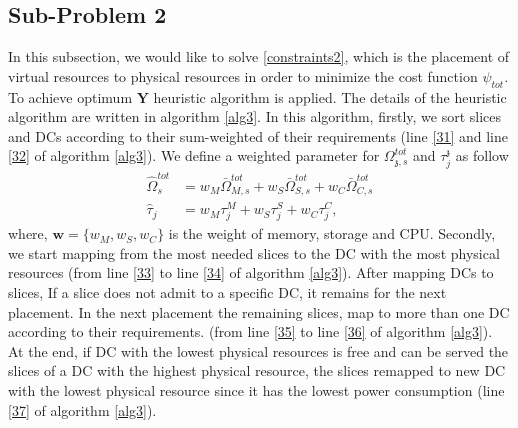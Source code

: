 \documentclass[conference]{IEEEtran}
\begin{document}
\subsection{Sub-Problem 2}
In this subsection, we would like to solve  \eqref{constraints2}, which is the placement of virtual resources to physical resources in order to minimize the cost function $\psi_{tot}$.
To achieve optimum $\boldsymbol{Y}$ heuristic algorithm is applied. The details of the heuristic algorithm are written in algorithm \eqref{alg3}. In this algorithm, firstly, we sort slices and DCs according to their sum-weighted of their requirements (line \ref{31} and line \ref{32} of algorithm \ref{alg3}).
We define a weighted parameter for $\Omega_{\mathfrak{z},s}^{tot}$ and $\tau_j^\mathfrak{z}$ as follow
\begin{equation}\label{wt}
\begin{split}
\hat{\Omega}_{s}^{tot} &= w_M \bar{\Omega}_{M,s}^{tot} + w_S \bar{\Omega}_{S,s}^{tot} + w_C \bar{\Omega}_{C,s}^{tot} \\
\hat{\tau}_j &= w_M \tau_{{j}}^M + w_S \tau_{{j}}^S + w_C \tau_{{j}}^C,
\end{split}
\end{equation}
where, $\boldsymbol{w} = \{w_M, w_S, w_C\}$ is the weight of memory, storage and CPU.
Secondly, we start mapping from the most needed slices to the DC with the most physical resources (from line \ref{33} to line \ref{34} of algorithm \ref{alg3}). After mapping DCs to slices, If a slice does not admit to a specific DC, it remains for the next placement. In the next placement the remaining slices, map to more than one DC according to their requirements. (from line \ref{35} to line \ref{36} of algorithm \ref{alg3}). At the end, if DC with the lowest physical resources is free and can be served the slices of a DC with the highest physical resource, the slices remapped to new DC with the lowest physical resource since it has the lowest power consumption (line \ref{37} of algorithm \ref{alg3}).
\end{document}
